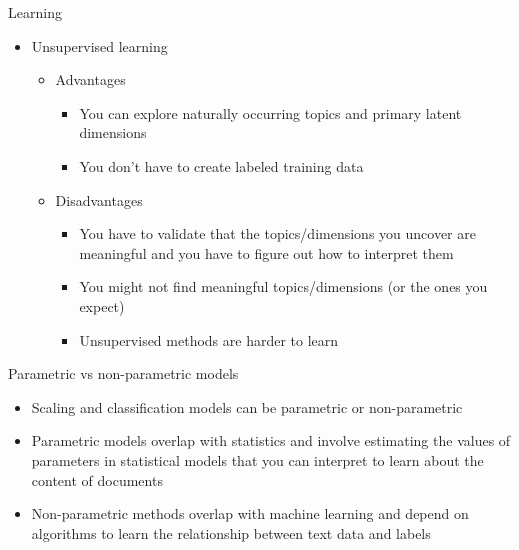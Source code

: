 \documentclass[pdf, 9pt, fleqn, handout]{beamer}
\begin{document}
\begin{frame}{Learning}
\begin{itemize}
\item Unsupervised learning \\[0.5em]
\begin{itemize}
\item Advantages \\[0.5em]
\begin{itemize}
\item You can explore naturally occurring topics and primary latent dimensions \\[0.5em]
\item You don't have to create labeled training data \\[0.5em]
\end{itemize}
\item Disadvantages \\[0.5em]
\begin{itemize}
\item You have to validate that the topics/dimensions you uncover are meaningful and you have to figure out how to interpret them \\[0.5em]
\item You might not find meaningful topics/dimensions (or the ones you expect) \\[0.5em]
\item Unsupervised methods are harder to learn
\end{itemize}
\end{itemize}
\end{itemize}
\end{frame}

\begin{frame}{Parametric vs non-parametric models}
\begin{itemize}
\item Scaling and classification models can be parametric or non-parametric \\[2em]
\item Parametric models overlap with statistics and involve estimating the values of parameters in statistical models that you can interpret to learn about the content of documents \\[2em]
\item Non-parametric methods overlap with machine learning and depend on algorithms to learn the relationship between text data and labels
\end{itemize}
\end{frame}
\end{document}
